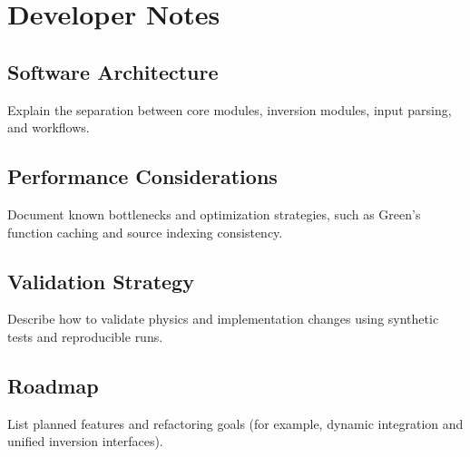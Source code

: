 \chapter{Developer Notes}

\section{Software Architecture}
Explain the separation between core modules, inversion modules, input parsing, and workflows.

\section{Performance Considerations}
Document known bottlenecks and optimization strategies, such as Green's function caching and source indexing consistency.

\section{Validation Strategy}
Describe how to validate physics and implementation changes using synthetic tests and reproducible runs.

\section{Roadmap}
List planned features and refactoring goals (for example, dynamic integration and unified inversion interfaces).


